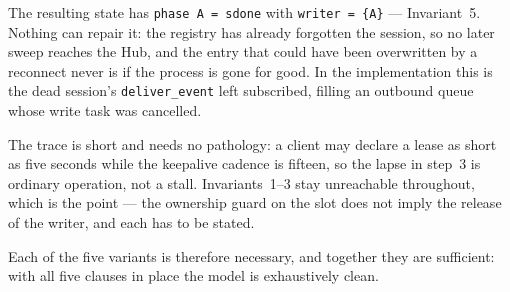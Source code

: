\documentclass[a4paper,10pt,fleqn]{article}
\begin{document}
The resulting state has \texttt{phase A = sdone} with \texttt{writer =
\{A\}} --- Invariant~5.  Nothing can repair it: the registry has already
forgotten the session, so no later sweep reaches the Hub, and the entry
that could have been overwritten by a reconnect never is if the process
is gone for good.  In the implementation this is the dead session's
\texttt{deliver\_event} left subscribed, filling an outbound queue whose
write task was cancelled.

The trace is short and needs no pathology: a client may declare a lease
as short as five seconds while the keepalive cadence is fifteen, so the
lapse in step~3 is ordinary operation, not a stall.  Invariants~1--3 stay
unreachable throughout, which is the point --- the ownership guard on the
slot does not imply the release of the writer, and each has to be stated.

Each of the five variants is therefore necessary, and together they are
sufficient: with all five clauses in place the model is exhaustively
clean.
\end{document}
